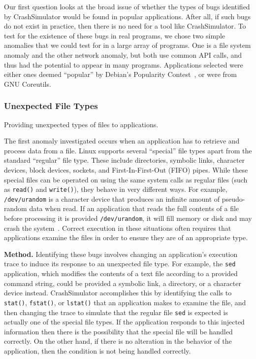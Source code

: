 Our first question looks at the broad issue of whether the types of bugs
identified by 
CrashSimulator would be found in popular applications.
After all, if such bugs
do not exist in practice, then there is no need for a tool like CrashSimulator.
To test for the existence of these bugs in real programs, we 
chose two simple anomalies that we could test for in a large
array of programs.  One is a file system anomaly and the other network anomaly,
but both use common API calls, and thus had the potential to appear in
many programs.  Applications selected were either ones deemed ``popular'' by
Debian's Popularity Contest~\cite{DebPopCon}, or were from GNU Coreutils.

\subsubsection{Unexpected File Types} 
\label{sec-file-type-bugs}
Providing unexpected types of files to
applications.

The first anomaly investigated occurs when an
application has to retrieve and process data from a file.  Linux supports
several ``special'' file types apart from the standard ``regular'' file type.
These include directories, symbolic links, character devices, block devices,
sockets, and First-In-First-Out (FIFO) pipes.  While these special files can
be operated on using the same system calls as regular files 
(such as {\tt read()} and {\tt write()}), they behave in very different
ways.  For example, {\tt /dev/urandom} is a character device that produces
an infinite amount of pseudo-random data when read.
If an application that reads the full contents of a file
before processing it is provided {\tt /dev/urandom}, it will fill memory
or disk and may crash the system~\cite{YumAptEndless}.
Correct execution in these situations
often requires that applications 
examine the files in order to ensure they are of an appropriate type.

{\bf Method.}  Identifying these bugs involves changing an application's
execution trace to induce its response to an unexpected file type. 
For example, the {\tt sed} application, which modifies the contents
of a text file according to a provided command string, could be provided
a symbolic link, a directory, or a character device
instead.  CrashSimulator accomplishes this by identifying the calls to {\tt
  stat()}, {\tt fstat()}, or {\tt lstat()} that an application makes to examine
the file, and then changing the trace to simulate that the regular file {\tt sed}
is expected is actually one of the special file types.  If the application
responds to this injected information then there is the possibility that the
special file will be handled correctly.  On the other hand, if there is no
alteration in the behavior of the application,  
then the condition is not being handled correctly.

